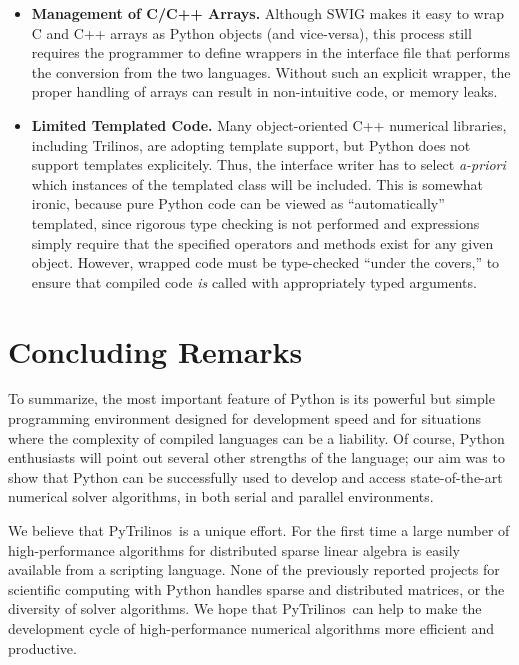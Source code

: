 \documentclass[acmtocl]{acmtrans2m}
\newcommand{\PyTrilinos}{{PyTrilinos}}
\begin{document}
\begin{itemize}
\item {\bf Management of C/C++ Arrays.} Although SWIG makes it easy to
  wrap C and C++ arrays as Python objects (and vice-versa), this
  process still requires the programmer to define wrappers in the
  interface file that performs the conversion from the two languages.
  Without such an explicit wrapper, the proper handling of
  arrays can result in non-intuitive code, or memory leaks.

\item {\bf Limited Templated Code.} Many object-oriented C++ numerical
  libraries, including Trilinos, are adopting template support, but
  Python does not support templates explicitely.  Thus, the interface
  writer has to select {\sl a-priori} which instances of the templated
  class will be included.  This is somewhat ironic, because pure
  Python code can be viewed as ``automatically'' templated, since
  rigorous type checking is not performed and expressions simply
  require that the specified operators and methods exist for any given
  object.  However, wrapped code must be type-checked ``under the
  covers,'' to ensure that compiled code {\sl is} called with
  appropriately typed arguments.

\end{itemize}

\section{Concluding Remarks}
\label{sec:concluding}

To summarize, the most important feature of Python is its powerful but
simple programming environment designed for development speed and for
situations where the complexity of compiled languages can be a
liability.  Of course, Python enthusiasts will point out several other
strengths of the language; our aim was to show that Python can be
successfully used to develop and access state-of-the-art numerical
solver algorithms, in both serial and parallel environments.

We believe that \PyTrilinos\ is a unique effort. For the first time
a large number of high-performance algorithms for distributed sparse
linear algebra is easily available from a scripting language.  None
of the previously reported projects for scientific computing with
Python handles sparse and distributed matrices, or the diversity of
solver algorithms.  We hope that \PyTrilinos\ can help to make the
development cycle of high-performance numerical algorithms more
efficient and productive.
\end{document}
